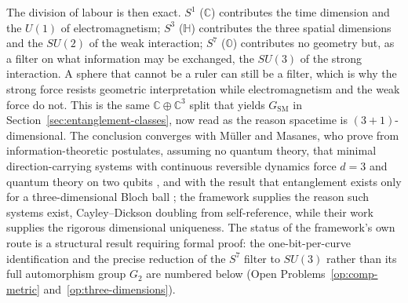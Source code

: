 The division of labour is then exact. $S^{1}$ ($\mathbb{C}$) contributes the time
dimension and the $U(1)$ of electromagnetism; $S^{3}$ ($\mathbb{H}$) contributes
the three spatial dimensions and the $SU(2)$ of the weak interaction; $S^{7}$
($\mathbb{O}$) contributes no geometry but, as a filter on what information may be
exchanged, the $SU(3)$ of the strong interaction. A sphere that cannot be a ruler
can still be a filter, which is why the strong force resists geometric
interpretation while electromagnetism and the weak force do not. This is the same
$\mathbb{C}\oplus\mathbb{C}^{3}$ split that yields $G_{\mathrm{SM}}$ in
Section~\ref{sec:entanglement-classes}, now read as the reason spacetime is $(3+1)$-%
dimensional. The conclusion converges with M\"uller and Masanes, who prove from
information-theoretic postulates, assuming no quantum theory, that minimal
direction-carrying systems with continuous reversible dynamics force $d=3$ and
quantum theory on two qubits \autocite{MuellerMasanes2013}, and with the result
that entanglement exists only for a three-dimensional Bloch ball
\autocite{MasanesMuellerEtAl2014}; the framework supplies the reason such systems
exist, Cayley--Dickson doubling from self-reference, while their work supplies
the rigorous dimensional uniqueness. The status of the framework's own route is a
structural result requiring formal proof: the one-bit-per-curve identification and
the precise reduction of the $S^{7}$ filter to $SU(3)$ rather than its full automorphism group
$G_{2}$ are numbered below (Open Problems~\ref{op:comp-metric} and~\ref{op:three-dimensions}).

